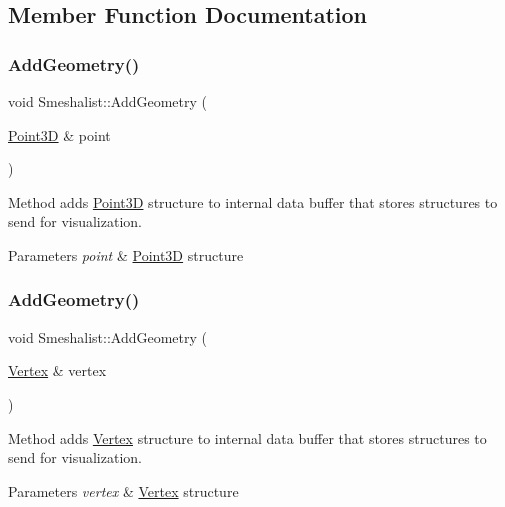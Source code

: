 \subsection{Member Function Documentation}
\hypertarget{class_smeshalist_a41602e1155a57128f4e261a471f0ae4a}{}\label{class_smeshalist_a41602e1155a57128f4e261a471f0ae4a} 
\subsubsection{\texorpdfstring{Add\+Geometry()}{AddGeometry()}\hspace{0.1cm}{\footnotesize\ttfamily [1/5]}}
{\footnotesize\ttfamily void Smeshalist\+::\+Add\+Geometry (\begin{DoxyParamCaption}\item[{\hyperlink{class_point3_d}{Point3D} \&}]{point }\end{DoxyParamCaption})}

Method adds \hyperlink{class_point3_d}{Point3D} structure to internal data buffer that stores structures to send for visualization. 
\begin{DoxyParams}{Parameters}
{\em point} & \hyperlink{class_point3_d}{Point3D} structure \\
\hline
\end{DoxyParams}
\hypertarget{class_smeshalist_adc9851608ab3ef54319f6549250275e7}{}\label{class_smeshalist_adc9851608ab3ef54319f6549250275e7} 
\subsubsection{\texorpdfstring{Add\+Geometry()}{AddGeometry()}\hspace{0.1cm}{\footnotesize\ttfamily [2/5]}}
{\footnotesize\ttfamily void Smeshalist\+::\+Add\+Geometry (\begin{DoxyParamCaption}\item[{\hyperlink{class_vertex}{Vertex} \&}]{vertex }\end{DoxyParamCaption})}

Method adds \hyperlink{class_vertex}{Vertex} structure to internal data buffer that stores structures to send for visualization. 
\begin{DoxyParams}{Parameters}
{\em vertex} & \hyperlink{class_vertex}{Vertex} structure \\
\hline
\end{DoxyParams}
\hypertarget{class_smeshalist_ae07be2d0483ccc8f21eabadd0ff4d2fb}{}\label{class_smeshalist_ae07be2d0483ccc8f21eabadd0ff4d2fb} 
